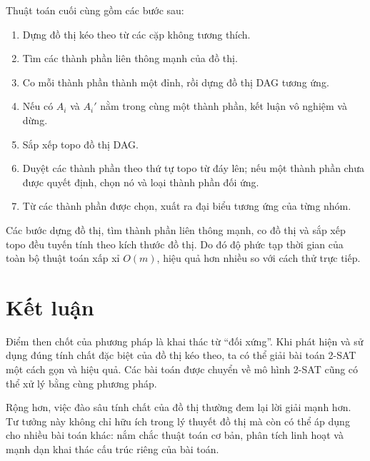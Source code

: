 \documentclass[11pt]{article}
\begin{document}
Thuật toán cuối cùng gồm các bước sau:
\begin{enumerate}
  \item Dựng đồ thị kéo theo từ các cặp không tương thích.
  \item Tìm các thành phần liên thông mạnh của đồ thị.
  \item Co mỗi thành phần thành một đỉnh, rồi dựng đồ thị DAG tương
  ứng.
  \item Nếu có $A_i$ và $A_i'$ nằm trong cùng một thành phần, kết luận
  vô nghiệm và dừng.
  \item Sắp xếp topo đồ thị DAG.
  \item Duyệt các thành phần theo thứ tự topo từ đáy lên; nếu một
  thành phần chưa được quyết định, chọn nó và loại thành phần đối ứng.
  \item Từ các thành phần được chọn, xuất ra đại biểu tương ứng của
  từng nhóm.
\end{enumerate}

Các bước dựng đồ thị, tìm thành phần liên thông mạnh, co đồ thị và sắp
xếp topo đều tuyến tính theo kích thước đồ thị. Do đó độ phức tạp thời
gian của toàn bộ thuật toán xấp xỉ $O(m)$, hiệu quả hơn nhiều so với
cách thử trực tiếp.

\section{Kết luận}

Điểm then chốt của phương pháp là khai thác từ ``đối xứng''. Khi phát
hiện và sử dụng đúng tính chất đặc biệt của đồ thị kéo theo, ta có thể
giải bài toán 2-SAT một cách gọn và hiệu quả. Các bài toán được chuyển
về mô hình 2-SAT cũng có thể xử lý bằng cùng phương pháp.

Rộng hơn, việc đào sâu tính chất của đồ thị thường đem lại lời giải
mạnh hơn. Tư tưởng này không chỉ hữu ích trong lý thuyết đồ thị mà còn
có thể áp dụng cho nhiều bài toán khác: nắm chắc thuật toán cơ bản,
phân tích linh hoạt và mạnh dạn khai thác cấu trúc riêng của bài toán.
\end{document}
